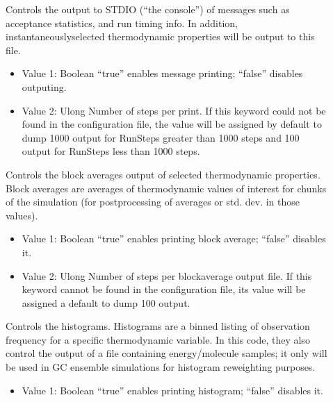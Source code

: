 \documentclass[letterpaper,10pt,english]{sphinxmanual}
\begin{document}
\begin{description}
\item[{}] \leavevmode
\sphinxAtStartPar
Controls the output to STDIO (“the console”) of messages such as acceptance statistics, and run timing info. In addition, instantaneously\sphinxhyphen{}selected thermodynamic properties will be output to this file.
\begin{itemize}
\item {} 
\sphinxAtStartPar
Value 1: Boolean \sphinxhyphen{} “true” enables message printing; “false” disables outputing.

\item {} 
\sphinxAtStartPar
Value 2: Ulong \sphinxhyphen{} Number of steps per print. If this keyword could not be found in the configuration file, the value will be assigned by default to dump 1000 output for RunSteps greater than 1000 steps and 100 output for RunSteps less than 1000 steps.

\end{itemize}

\item[{}] \leavevmode
\sphinxAtStartPar
Controls the block averages output of selected thermodynamic properties. Block averages are averages of thermodynamic values of interest for chunks of the simulation (for post\sphinxhyphen{}processing of averages or std. dev. in those values).
\begin{itemize}
\item {} 
\sphinxAtStartPar
Value 1: Boolean \sphinxhyphen{} “true” enables printing block average; “false” disables it.

\item {} 
\sphinxAtStartPar
Value 2: Ulong \sphinxhyphen{} Number of steps per block\sphinxhyphen{}average output file. If this keyword cannot be found in the configuration file, its value will be assigned a default to dump 100 output.

\end{itemize}

\item[{}] \leavevmode
\sphinxAtStartPar
Controls the histograms. Histograms are a binned listing of observation frequency for a specific thermodynamic variable. In this code, they also control the output of a file containing energy/molecule samples; it only will be used in GC ensemble simulations for histogram reweighting purposes.
\begin{itemize}
\item {} 
\sphinxAtStartPar
Value 1: Boolean \sphinxhyphen{} “true” enables printing histogram; “false” disables it.


\end{itemize}
\end{description}
\end{document}
